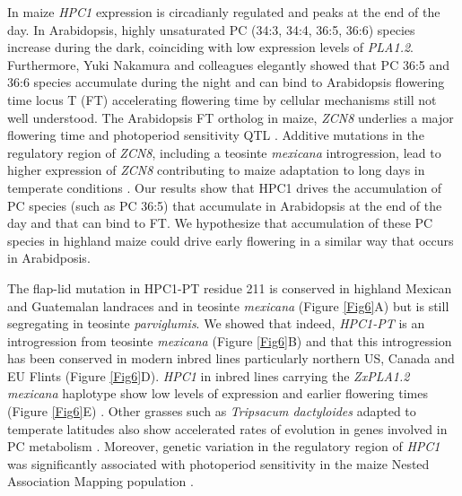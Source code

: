 \documentclass[9pt,twocolumn,twoside,lineno]{BioRxiv}
\begin{document}
In maize \textit{HPC1} expression is circadianly regulated\cite{Khan2010-iv} and peaks at the end of the day. 
In Arabidopsis, highly unsaturated PC (34:3, 34:4, 36:5, 36:6) species increase during the dark\cite{Maatta2012-ip}, coinciding with low expression levels of \textit{PLA1.2}\cite{Khan2010-iv}.
Furthermore, Yuki Nakamura and colleagues elegantly showed that PC 36:5 and 36:6 species accumulate during the night and can bind to Arabidopsis flowering time locus T (FT) accelerating flowering time \cite{Nakamura2014-qf} by cellular mechanisms still not well understood. 
The Arabidopsis FT ortholog in maize, \textit{ZCN8} \cite{Lazakis2011-nq} underlies a major flowering time and photoperiod sensitivity QTL \cite{Hung2012-ms}.
Additive mutations in the regulatory region of \textit{ZCN8}, including a teosinte \textit{mexicana} introgression, lead to higher expression of \textit{ZCN8} contributing to maize adaptation to long days in temperate conditions \cite{Guo2019-pn}.
Our results show that HPC1 drives the accumulation of PC species (such as PC 36:5) that accumulate in Arabidopsis at the end of the day and that can bind to FT. 
We hypothesize that accumulation of these PC species in highland maize could drive early flowering in a similar way that occurs in Arabidposis. 

The flap-lid mutation in HPC1-PT residue 211 is conserved in highland Mexican and Guatemalan landraces and in teosinte \textit{mexicana} (Figure \ref{Fig6}A) but is still segregating in teosinte \textit{parviglumis}. 
We showed that indeed, \textit{HPC1-PT} is an introgression from teosinte \textit{mexicana} (Figure \ref{Fig6}B) and that this introgression has been conserved in modern inbred lines particularly northern US, Canada and EU Flints (Figure \ref{Fig6}D). 
\textit{HPC1} in inbred lines carrying the \textit{ZxPLA1.2} \textit{mexicana} haplotype show low levels of expression and earlier flowering times (Figure \ref{Fig6}E) \cite{Kremling2018-gn}. 
Other grasses such as \textit{Tripsacum dactyloides} adapted to temperate latitudes also show accelerated rates of evolution in genes involved in PC metabolism \cite{Yan2019-tx}.
Moreover, genetic variation in the regulatory region of \textit{HPC1} was significantly associated with photoperiod sensitivity in the maize Nested Association Mapping population \cite{Hung2012-ms}. 
\end{document}
